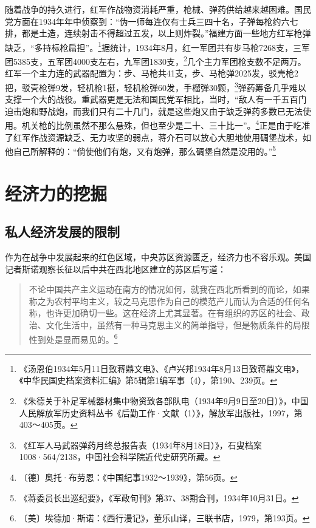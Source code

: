 随着战争的持久进行，红军作战物资消耗严重，枪械、弹药供给越来越困难。国民党方面在1934年年中侦察到：“伪一师每连仅有士兵三四十名，子弹每枪约六七排，都是土造，连续射击不得超过五发，以上则炸裂。”福建方面一些地方红军枪弹缺乏，“多持标枪扁担”。\footnote{《汤恩伯1934年5月11日致蒋鼎文电》、《卢兴邦1934年8月13日致蒋鼎文电》，《中华民国史档案资料汇编》第5辑第1编军事（4），第190、239页。}据统计，1934年8月，红一军团共有步马枪7268支，三军团5385支，五军团4000支左右，九军团1830支，\footnote{《朱德关于补足军械器材集中物资致各部队电（1934年9月9日至20日）》，中国人民解放军历史资料丛书《后勤工作·文献（1）》，解放军出版社，1997，第403～405页。}几个主力军团枪支数不足两万。红军一个主力连的武器配置为：步、马枪共41支，步、马枪弹2025发，驳壳枪2把，驳壳枪弹9发，轻机枪1挺，轻机枪弹60发，手榴弹30颗，\footnote{《红军人马武器弹药月终总报告表（1934年8月18日）》，石叟档案1008·564/2138，中国社会科学院近代史研究所藏。}弹药筹备几乎难以支撑一个大的战役。重武器更是无法和国民党军相比，当时，“敌人有一千五百门迫击炮和野战炮，而我们只有二十几门，就是这些炮又由于缺乏弹药多数已无法使用。机关枪的比例虽然不那么悬殊，但也至少是二十、三十比一”。\footnote{〔德〕奥托·布劳恩：《中国纪事1932～1939》，第56页。}正是由于吃准了红军作战资源缺乏、无力攻坚的弱点，蒋介石可以放心大胆地使用碉堡战术，如他自己所解释的：“倘使他们有炮，又有炮弹，那么碉堡自然是没用的。”\footnote{《蒋委员长出巡纪要》，《军政旬刊》第37、38期合刊，1934年10月31日。}

\section{经济力的挖掘}

\subsection{私人经济发展的限制}


作为在战争中发展起来的红色区域，中央苏区资源匮乏，经济力也不容乐观。美国记者斯诺观察长征以后中共在西北地区建立的苏区后写道：

\begin{quote}

不论中国共产主义运动在南方的情况如何，就我在西北所看到的而论，如果称之为农村平均主义，较之马克思作为自己的模范产儿而认为合适的任何名称，也许更加确切一些。这在经济上尤其显著。在有组织的苏区的社会、政治、文化生活中，虽然有一种马克思主义的简单指导，但是物质条件的局限性到处是显而易见的。\footnote{〔美〕埃德加·斯诺：《西行漫记》，董乐山译，三联书店，1979，第193页。}
\end{quote}


